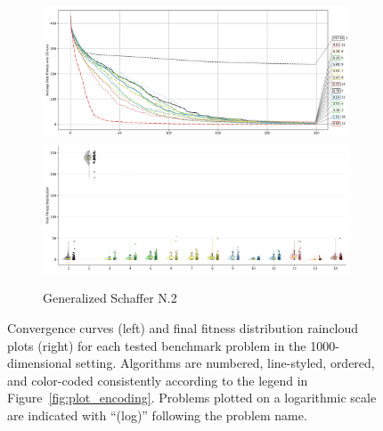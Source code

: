 \begin{figure}[p]
\begin{subfigure}{1\textwidth}
    \centering
    \includegraphics[width=.49\textwidth]{Figures/results/1000/Generalized_Schaffer_N2_All_selected_algorithms_dim1000_annot_legend.png}
    \includegraphics[width=.49\textwidth]{Figures/results/1000/Generalized_Schaffer_N2_all_dim1000_raincloud_vertical.png}
    \caption{Generalized Schaffer N.2}
\end{subfigure}

\captionsetup{list=no}
\caption[Convergence curves and final fitness distribution raincloud plots for 1000-dimensional problems]{Convergence curves (left) and final fitness distribution raincloud plots (right) for each tested benchmark problem in the 1000-dimensional setting. Algorithms are numbered, line-styled, ordered, and color-coded consistently according to the legend in Figure~\ref{fig:plot_encoding}. Problems plotted on a logarithmic scale are indicated with ``(log)'' following the problem name.}
\end{figure}





